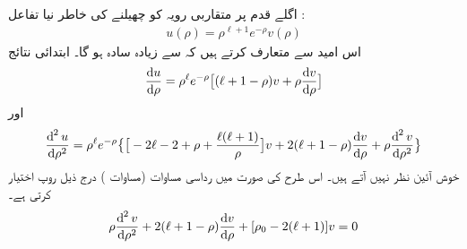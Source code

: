   اگلے قدم پر متقاربی رویہ  کو چھیلنے کی خاطر  نیا تفاعل :
  \begin{align}\label{مساوات_ابعادی_نئی_علامتیت}
u(\rho)=\rho^{\ell+1}e^{-\rho}v(\rho) 
\end{align}
  اس امید سے متعارف کرتے ہیں کہ         سے   زیادہ سادہ ہو گا۔ ابتدائی نتائج 
\begin{align*}
\frac{\dif u}{\dif \rho}=\rho^{\ell} e^{-\rho} \big[(\ell+1-\rho)v+\rho\frac{\dif v}{\dif \rho}\big]
\end{align*}
اور
\begin{align*}
\frac{\dif^{\,2}u}{\dif \rho^2}=\rho^{\ell}e^{-\rho}\big\{\big[-2\ell-2+\rho+\frac{\ell(\ell+1)}{\rho}\big]v+2(\ell+1-\rho)\frac{\dif v}{\dif \rho}+\rho\frac{\dif^{\,2}v}{\dif \rho^2}\big\}
\end{align*}
خوش آئین نظر نہیں آتے ہیں۔   اس طرح  کی صورت میں رداسی مساوات (مساوات )   درج ذیل روپ اختیار کرتی ہے۔
  \begin{align}\label{مساوات_ابعادی_رداسی_نئی_روپ}
\rho\frac{\dif^{\,2}{v}}{\dif{\rho^{2}}}+2(\ell+1-\rho)\frac{\dif{v}}{\dif{\rho}}+[\rho_{0}-2(\ell+1)]v=0 
\end{align}

